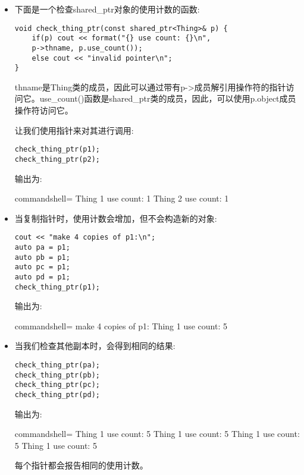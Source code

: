 \begin{itemize}
\item 
下面是一个检查shared\_ptr对象的使用计数的函数:

\begin{lstlisting}[style=styleCXX]
void check_thing_ptr(const shared_ptr<Thing>& p) {
	if(p) cout << format("{} use count: {}\n",
	p->thname, p.use_count());
	else cout << "invalid pointer\n";
}
\end{lstlisting}

thname是Thing类的成员，因此可以通过带有p->成员解引用操作符的指针访问它。use\_count()函数是shared\_ptr类的成员，因此，可以使用p.object成员操作符访问它。

让我们使用指针来对其进行调用:

\begin{lstlisting}[style=styleCXX]
check_thing_ptr(p1);
check_thing_ptr(p2);
\end{lstlisting}

输出为:

\begin{tcblisting}{commandshell={}}
Thing 1 use count: 1
Thing 2 use count: 1
\end{tcblisting}


\item 
当复制指针时，使用计数会增加，但不会构造新的对象:

\begin{lstlisting}[style=styleCXX]
cout << "make 4 copies of p1:\n";
auto pa = p1;
auto pb = p1;
auto pc = p1;
auto pd = p1;
check_thing_ptr(p1);
\end{lstlisting}

输出为:

\begin{tcblisting}{commandshell={}}
make 4 copies of p1:
Thing 1 use count: 5
\end{tcblisting}

\item 
当我们检查其他副本时，会得到相同的结果:

\begin{lstlisting}[style=styleCXX]
check_thing_ptr(pa);
check_thing_ptr(pb);
check_thing_ptr(pc);
check_thing_ptr(pd);
\end{lstlisting}

输出为:

\begin{tcblisting}{commandshell={}}
Thing 1 use count: 5
Thing 1 use count: 5
Thing 1 use count: 5
Thing 1 use count: 5
\end{tcblisting}

每个指针都会报告相同的使用计数。


\end{itemize}
